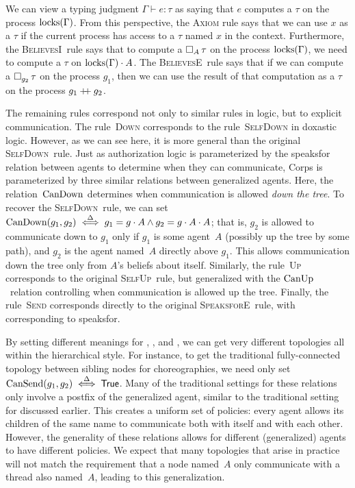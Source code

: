 We can view a typing judgment $\Gamma \vdash e : \tau$ as saying that $e$ computes a $\tau$ on the process $\text{locks}(\Gamma)$.
From this perspective, the \textsc{Axiom} rule says that we can use $x$ as a $\tau$ if the current process has access to a $\tau$ named $x$ in the context.
Furthermore, the \textsc{BelievesI}~rule says that to compute a $\mathop{\square_{A}} \tau$ on the process $\text{locks}(\Gamma)$, we need to compute a $\tau$ on $\text{locks}(\Gamma) \cdot A$.
The \textsc{BelievesE}~rule says that if we can compute a $\mathop{\square_{g_2}} \tau$ on the process $g_1$, then we can use the result of that computation as a $\tau$ on the process $g_1 \mathbin{+\!\!+} g_2$.

The remaining rules correspond not only to similar rules in logic, but to explicit communication.
The rule~\textsc{Down} corresponds to the rule~\textsc{SelfDown} in doxastic logic.
However, as we can see here, it is more general than the original \textsc{SelfDown}~rule.
Just as authorization logic is parameterized by the \textsf{speaksfor} relation between agents to determine when they can communicate, Corps is parameterized by three similar relations between generalized agents.
Here, the relation~$\text{CanDown}$ determines when communication is allowed \emph{down the tree}.
To recover the \textsc{SelfDown}~rule, we can set $\text{CanDown}(g_1, g_2) \overset{\Delta}{\iff} g_1 = g \cdot A \land g_2 = g \cdot A \cdot A$; that is, $g_2$ is allowed to communicate down to $g_1$ only if $g_1$ is some agent~$A$ (possibly up the tree by some path), and $g_2$ is the agent named~$A$ directly above $g_1$.
This allows communication down the tree only from $A$'s beliefs about itself.
Similarly, the rule~\textsc{Up} corresponds to the original \textsc{SelfUp}~rule, but generalized with the $\text{CanUp}$~relation controlling when communication is allowed up the tree.
Finally, the rule~\textsc{Send} corresponds directly to the original \textsc{SpeaksforE}~rule, with \cansendname{} corresponding to \textsf{speaksfor}.

By setting different meanings for \candownname{}, \canupname{}, and \cansendname{}, we can get very different topologies all within the hierarchical style.
For instance, to get the traditional fully-connected topology between sibling nodes for choreographies, we need only set $\text{CanSend}(g_1, g_2) \overset{\Delta}{\iff} \textsf{True}$.
Many of the traditional settings for these relations only involve a postfix of the generalized agent, similar to the traditional setting for \candownname{} discussed earlier.
This creates a uniform set of policies: every agent allows its children of the same name to communicate both with itself and with each other.
However, the generality of these relations allows for different (generalized) agents to have different policies.
We expect that many topologies that arise in practice will not match the requirement that a node named~$A$ only communicate with a thread also named~$A$, leading to this generalization.


